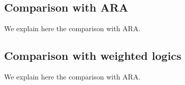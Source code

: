 %
%
%

\medskip

\subsection{Comparison with ARA}

We explain here the comparison with ARA.

\subsection{Comparison with weighted logics}

We explain here the comparison with ARA.


